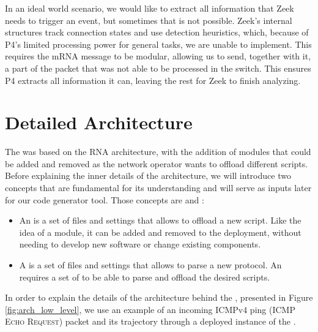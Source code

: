 In an ideal world scenario, we would like to extract all information that Zeek needs to trigger an event, but sometimes that is not possible. Zeek's internal structures track connection states and use detection heuristics, which, because of P4's limited processing power for general tasks, we are unable to implement. This requires the mRNA message to be modular, allowing us to send, together with it, a part of the packet that was not able to be processed in the switch. This ensures P4 extracts all information it can, leaving the rest for Zeek to finish analyzing.

% 
\section{Detailed Architecture}

The \TheSolutionName{} was based on the RNA architecture, with the addition of modules that could be added and removed as the network operator wants to offload different scripts. Before explaining the inner details of the architecture, we will introduce two concepts that are fundamental for its understanding and will serve as inputs later for our code generator tool. Those concepts are \ProtocolTemplate{} and \Offloader{}:

\begin{itemize}
    \item An \textbf{\Offloader{}} is a set of files and settings that allows \TheSolutionName{} to offload a new script. Like the idea of a module, it can be added and removed to the deployment, without needing to develop new software or change existing components.

    \item A \textbf{\ProtocolTemplate{}} is a set of files and settings that allows \TheSolutionName{} to parse a new protocol. An \Offloader{} requires a set of \ProtocolTemplates{} to be able to parse and offload the desired scripts.
\end{itemize}

In order to explain the details of the architecture behind the \TheSolutionName{}, presented in Figure \ref{fig:arch_low_level}, we use an example of an incoming ICMPv4 ping (\textsc{ICMP Echo Request}) packet and its trajectory through a deployed instance of the \TheSolutionName{}.

